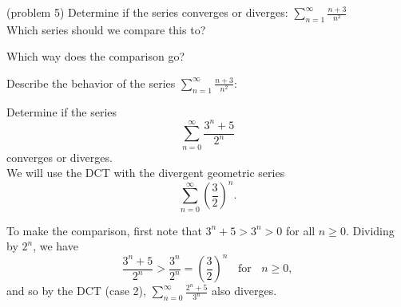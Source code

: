 \documentclass[handout]{ximera}
\begin{document}
\begin{problem}(problem 5)
Determine if the series converges or diverges: $\displaystyle{\sum_{n=1}^\infty \frac{n+3}{n^2}}$\\
Which series should we compare this to?

\begin{multipleChoice}
\end{multipleChoice}

Which way does the comparison go?
\begin{multipleChoice}
\end{multipleChoice}

Describe the behavior of the series $\sum_{n=1}^\infty \frac{n+3}{n^2}:$
\begin{multipleChoice}
\end{multipleChoice}

\end{problem}



\begin{example}[example 6] %
Determine if the series 
\[
\sum_{n=0}^\infty \frac{3^n + 5}{2^n}
\]
 converges or diverges.\\
We will use the DCT with the divergent geometric series 
\[
\sum_{n=0}^\infty \left(\frac32\right)^n.
\]

To make the comparison, first note that $3^n + 5 > 3^n > 0$ for all $n \geq 0$. Dividing by $2^n$, we have 
\[
\frac{3^n + 5}{2^n} > \frac{3^n}{2^n} = \left(\frac32\right)^n \;\; \text{ for } \;\; n \geq 0,
\]
and so by the DCT (case 2), $\sum_{n=0}^\infty \frac{2^n + 5}{3^n}$ also diverges.
\end{example}
\end{document}
